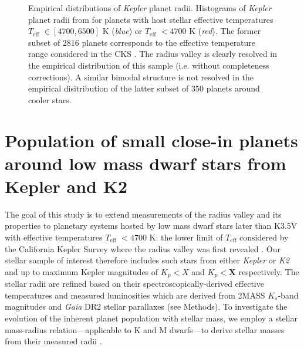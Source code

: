 \documentclass[modern]{aastex63}
\newcommand\gaia{\emph{Gaia}}
\newcommand\kepler{\emph{Kepler}}
\newcommand\ktwo{\emph{K2}}
\newcommand\teff{$T_{\text{eff}}$}
\begin{document}
\begin{figure}
  \centering
  \caption{Empirical distributions of \kepler{} planet radii. Histograms of \kepler{} planet radii
    from \cite{berger18} for planets with host stellar effective temperatures \teff{} $\in [4700,6500]$ K
    (\emph{blue}) or \teff{} $<4700$ K (\emph{red}). The former subset of 2816 planets corresponds to the
    effective temperature range considered in the CKS \citep{fulton17}. The radius valley is clearly resolved
    in the empirical distribution of this sample (i.e. without completeness corrections). A similar bimodal
    structure is not resolved in the empirical disitribution of the latter subset of 350 planets around cooler
    stars.}
  \label{fig:berger}
\end{figure}



\section{Population of small close-in planets around low mass dwarf stars from Kepler and K2} \label{sect:planets}
The goal of this study is to extend measurements of the radius valley and its properties to planetary systems
hosted by low mass dwarf stars later than K3.5V \citep{pecaut13} with effective temperatures \teff{} $<4700$ K:
the lower limit of \teff{} considered by the California Kepler Survey where the radius valley was first revealed
\cite{fulton17}. Our stellar sample of interest therefore includes such stars from either \kepler{} or \ktwo{}
and up to maximum Kepler magnitudes of $K_p<X$ and $K_p<\mathbf{X}$ respectively.
The stellar radii are refined based on their spectroscopically-derived effective temperatures
\citep{gaidos16,mathur17,petigura17} and measured
luminosities which are derived from 2MASS $K_s$-band magnitudes \citep{cutri03} and \gaia{} DR2 stellar parallaxes
\citep{lindegren18} (see Methods). To investigate the evolution of the inherent planet population
with stellar mass, we employ a stellar mass-radius relation---applicable to K and M dwarfs---to derive stellar
masses from their measured radii \citep{boyajian12}.
\end{document}
